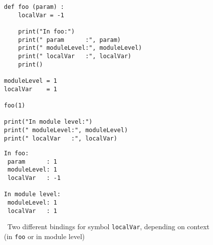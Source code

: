 
\begin{frame}[fragile]
%
\begin{tcbraster}[raster columns=2,
                  raster equal height,
                  nobeforeafter,
                  raster column skip=0.5cm]
\begin{codebox}
\begin{verbatim}
def foo (param) :
    localVar = -1

    print("In foo:")
    print(" param      :", param)
    print(" moduleLevel:", moduleLevel)
    print(" localVar   :", localVar)
    print()

moduleLevel = 1
localVar    = 1

foo(1)

print("In module level:")
print(" moduleLevel:", moduleLevel)
print(" localVar   :", localVar)
\end{verbatim}
\end{codebox}
%
\begin{cmdbox}
\begin{verbatim}
In foo:
 param      : 1
 moduleLevel: 1
 localVar   : -1

In module level:
 moduleLevel: 1
 localVar   : 1
\end{verbatim}
\end{cmdbox}
\end{tcbraster}
%
\Thus~Two different bindings for symbol \texttt{localVar}, depending on context\\
\phantom{.}\qquad(in \texttt{foo} or in module level)
%
\end{frame}


